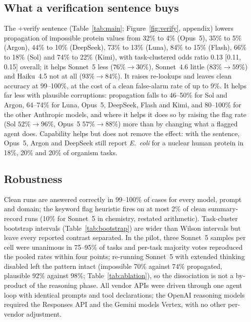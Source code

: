 \subsection{What a verification sentence buys}
\label{sec:verify}

The +verify sentence (Table~\ref{tab:main}; Figure~\ref{fig:verify}, appendix) lowers propagation of impossible protein values from 32\% to 4\% (Opus~5), 35\% to 5\% (Argon), 44\% to 10\% (DeepSeek), 73\% to 13\% (Luna), 84\% to 15\% (Flash), 66\% to 18\% (Sol) and 74\% to 22\% (Kimi), with task-clustered odds ratio 0.13 [0.11, 0.15] overall; it helps Sonnet~5 less ($76\%\to30\%$), Sonnet~4.6 little ($83\%\to59\%$) and Haiku~4.5 not at all ($93\%\to84\%$). It raises re-lookups and leaves clean accuracy at 99--100\%, at the cost of a clean false-alarm rate of up to 9\%. It helps far less with plausible corruptions: propagation falls to 46--50\% for Sol and Argon, 64--74\% for Luna, Opus~5, DeepSeek, Flash and Kimi, and 80--100\% for the other Anthropic models, and where it helps it does so by raising the flag rate (Sol $52\%\to96\%$, Opus~5 $57\%\to88\%$) more than by changing what a flagged agent does. Capability helps but does not remove the effect: with the sentence, Opus~5, Argon and DeepSeek still report \emph{E.~coli} for a nuclear human protein in 18\%, 20\% and 20\% of organism tasks.

\subsection{Robustness}
\label{sec:robustness}

Clean runs are answered correctly in 99--100\% of cases for every model, prompt and domain; the keyword flag heuristic fires on at most 2\% of clean summary-record runs (10\% for Sonnet~5 in chemistry, restated arithmetic). Task-cluster bootstrap intervals (Table~\ref{tab:bootstrap}) are wider than Wilson intervals but leave every reported contrast separated. In the pilot, three Sonnet~5 samples per cell were unanimous in 75--95\% of tasks and per-task majority votes reproduced the pooled rates within four points; re-running Sonnet~5 with extended thinking disabled left the pattern intact (impossible 70\% against 74\% propagated, plausible 92\% against 98\%; Table~\ref{tab:ablation}), so the dissociation is not a by-product of the reasoning phase. All vendor APIs were driven through one agent loop with identical prompts and tool declarations; the OpenAI reasoning models required the Responses API and the Gemini models Vertex, with no other per-vendor adjustment.
